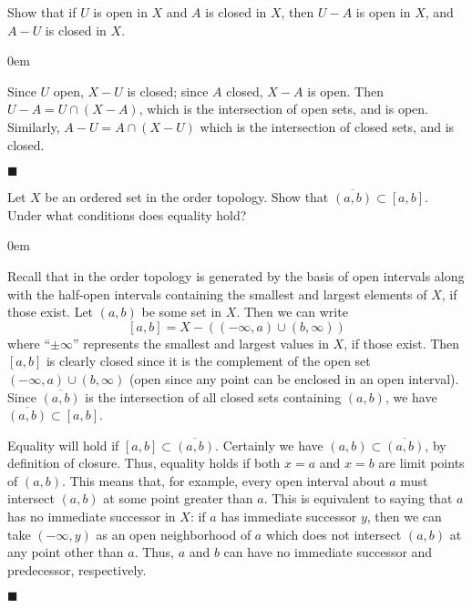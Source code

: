 \documentclass[12pt]{article}
\renewcommand{\qed}{\hfill$\blacksquare$}
\renewenvironment{proof}{\begin{addmargin}[1em]{0em}\begin{newproof}}{\end{newproof}\end{addmargin}\qed}
\newenvironment{problem}[2][Exercise]{\begin{trivlist}
\item[\hskip \labelsep {\bfseries #1}\hskip \labelsep {\bfseries #2.}]}{\end{trivlist}}
\begin{document}
\begin{problem}{17.4}
	Show that if $U$ is open in $X$ and $A$ is closed in $X$, then $U-A$ is open in $X$, and $A-U$ is closed in $X$.
\end{problem}
\begin{proof}
	Since $U$ open, $X-U$ is closed; since $A$ closed, $X-A$ is open. Then $U-A = U\cap \left(X-A\right)$, which is the intersection of open sets, and is open. Similarly, $A-U = A \cap \left(X-U\right)$ which is the intersection of closed sets, and is closed.
\end{proof}


\begin{problem}{17.5}
Let $X$ be an ordered set in the order topology. Show that $\overline{\left(a,b\right)}\subset \left[a,b\right]$. Under what conditions does equality hold?
\end{problem}
\begin{proof}
	Recall that in the order topology is generated by the basis of open intervals along with the half-open intervals containing the smallest and largest elements of $X$, if those exist. Let $\left(a,b\right)$ be some set in $X$. Then we can write $$ \left[a,b\right] = X-\left(\left(-\infty, a\right)\cup\left(b,\infty\right) \right) $$ where ``$\pm\infty$'' represents the smallest and largest values in $X$, if those exist. Then $\left[a,b\right]$ is clearly closed since it is the complement of the open set $\left(-\infty,a\right)\cup\left(b,\infty\right)$ (open since any point can be enclosed in an open interval). Since $\overline{\left(a,b\right)}$ is the intersection of all closed sets containing $\left(a,b\right)$, we have $\overline{\left(a,b\right)} \subset \left[a,b\right]$.
	
	Equality will hold if $\left[a,b\right] \subset \overline{\left(a,b\right)}$. Certainly we have $\left(a,b\right) \subset \overline{\left(a,b\right)}$, by definition of closure. Thus, equality holds if both $x=a$ and $x=b$ are limit points of $\left(a,b\right)$. This means that, for example, every open interval about $a$ must intersect $\left(a,b\right)$ at some point greater than $a$. This is equivalent to saying that $a$ has no immediate successor in $X$: if $a$ has immediate successor $y$, then we can take $\left(-\infty,y\right)$ as an open neighborhood of $a$ which does not intersect $\left(a,b\right)$ at any point other than $a$. Thus, $a$ and $b$ can have no immediate successor and predecessor, respectively.
\end{proof}
\end{document}
